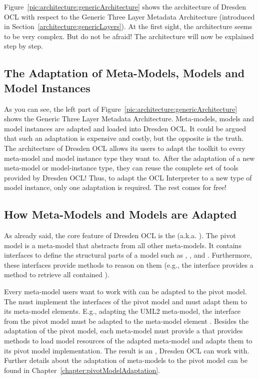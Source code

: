Figure~\ref{pic:architecture:genericArchitecture} shows the architecture of 
Dresden OCL with respect to the Generic Three Layer Metadata Architecture
(introduced in Section~\ref{architecture:genericLayers}). At the first sight, 
the architecture seems to be very complex. But do not be afraid! The 
architecture will now be explained step by step.


\subsection{The Adaptation of Meta-Models, Models and Model Instances}

As you can see, the left part of 
Figure~\ref{pic:architecture:genericArchitecture} shows the Generic Three Layer
Metadata Architecture. Meta-models, models and model instances are adapted and 
loaded into Dresden OCL. It could be argued that such an adaptation is expensive
and costly, but the opposite is the truth. The architecture of Dresden OCL allows
its users to adapt the toolkit to every meta-model and model instance type they 
want to. After the adaptation of a new meta-model or model-instance type, they
can reuse the complete set of tools provided by Dresden OCL! Thus,
to adapt the \acs{OCL} Interpreter to a new type of model instance, only one 
adaptation is required. The rest comes for free!


\subsection{How Meta-Models and Models are Adapted}
\label{architecture:metaModelAdaptation}

As already said, the core feature of Dresden OCL is the 
(a.k.a. ). The pivot model is a meta-model that abstracts
from all other meta-models. It contains interfaces to define the structural 
parts of a model such as
, ,  and . 
Furthermore, these interfaces provide methods to reason on them (e.g., the 
interface  provides a method  to 
retrieve all contained ).

Every meta-model users want to work with can be adapted to the pivot model. The
 must implement the interfaces of the pivot model 
and must adapt them to its meta-model elements. E.g., adapting the \acs{UML}2 
meta-model, the interface  from the pivot model must be adapted to 
the meta-model element . Besides the adaptation of the pivot 
model, each meta-model must provide a  that provides 
methods to load model resources of the adapted meta-model and adapts them to 
its pivot model implementation. The result is an ,
Dresden OCL can work with. Further details about the adaptation of meta-models to
the pivot model can be found in Chapter~\ref{chapter:pivotModelAdaptation}.


